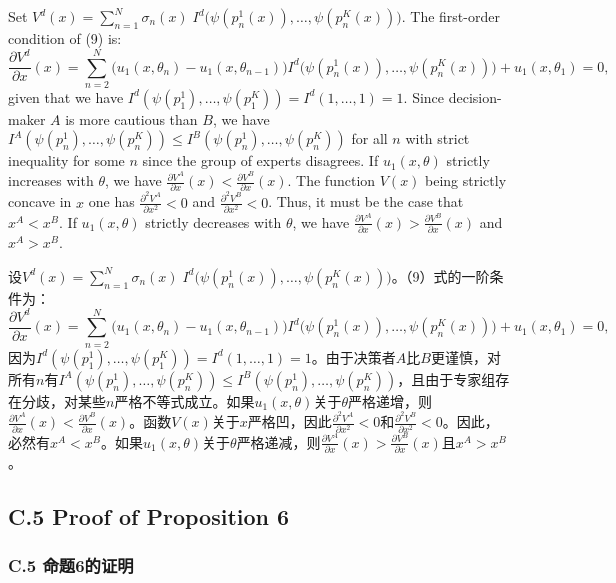 \documentclass[12pt,a4paper]{article}
\newenvironment{original}
  {\par\noindent\ignorespaces}
  {\par}
\newenvironment{translation}
  {\par\noindent{\color{transblue}\ignorespaces}}
  {\par\medskip}
\begin{document}
\begin{original}
Set $V^{d}(x) = \sum_{n=1}^{N} \sigma_{n}(x) \; I^{d}\!\big(\psi(p^{1}_{n}(x)), \dots, \psi(p^{K}_{n}(x))\big)$. The first-order condition of (9) is:
\[
\frac{\partial V^{d}}{\partial x}(x) = \sum_{n=2}^{N} \Big(u_{1}(x, \theta_{n}) - u_{1}(x, \theta_{n-1})\Big) I^{d}\!\big(\psi(p^{1}_{n}(x)), \dots, \psi(p^{K}_{n}(x))\big) + u_{1}(x, \theta_{1}) = 0, \tag{C.3}
\]
given that we have $I^{d}(\psi(p^{1}_{1}), \dots, \psi(p^{K}_{1})) = I^{d}(1, \dots, 1) = 1$. Since decision-maker $A$ is more cautious than $B$, we have $I^{A}(\psi(p^{1}_{n}), \dots, \psi(p^{K}_{n})) \leq I^{B}(\psi(p^{1}_{n}), \dots, \psi(p^{K}_{n}))$ for all $n$ with strict inequality for some $n$ since the group of experts disagrees. If $u_{1}(x, \theta)$ strictly increases with $\theta$, we have $\frac{\partial V^{A}}{\partial x}(x) < \frac{\partial V^{B}}{\partial x}(x)$. The function $V(x)$ being strictly concave in $x$ one has $\frac{\partial^{2} V^{A}}{\partial x^{2}} < 0$ and $\frac{\partial^{2} V^{B}}{\partial x^{2}} < 0$. Thus, it must be the case that $x^{A} < x^{B}$. If $u_{1}(x, \theta)$ strictly decreases with $\theta$, we have $\frac{\partial V^{A}}{\partial x}(x) > \frac{\partial V^{B}}{\partial x}(x)$ and $x^{A} > x^{B}$.
\end{original}

\begin{translation}
设$V^{d}(x) = \sum_{n=1}^{N} \sigma_{n}(x) \; I^{d}\!\big(\psi(p^{1}_{n}(x)), \dots, \psi(p^{K}_{n}(x))\big)$。（9）式的一阶条件为：
\[
\frac{\partial V^{d}}{\partial x}(x) = \sum_{n=2}^{N} \Big(u_{1}(x, \theta_{n}) - u_{1}(x, \theta_{n-1})\Big) I^{d}\!\big(\psi(p^{1}_{n}(x)), \dots, \psi(p^{K}_{n}(x))\big) + u_{1}(x, \theta_{1}) = 0, \tag{C.3}
\]
因为$I^{d}(\psi(p^{1}_{1}), \dots, \psi(p^{K}_{1})) = I^{d}(1, \dots, 1) = 1$。由于决策者$A$比$B$更谨慎，对所有$n$有$I^{A}(\psi(p^{1}_{n}), \dots, \psi(p^{K}_{n})) \leq I^{B}(\psi(p^{1}_{n}), \dots, \psi(p^{K}_{n}))$，且由于专家组存在分歧，对某些$n$严格不等式成立。如果$u_{1}(x, \theta)$关于$\theta$严格递增，则$\frac{\partial V^{A}}{\partial x}(x) < \frac{\partial V^{B}}{\partial x}(x)$。函数$V(x)$关于$x$严格凹，因此$\frac{\partial^{2} V^{A}}{\partial x^{2}} < 0$和$\frac{\partial^{2} V^{B}}{\partial x^{2}} < 0$。因此，必然有$x^{A} < x^{B}$。如果$u_{1}(x, \theta)$关于$\theta$严格递减，则$\frac{\partial V^{A}}{\partial x}(x) > \frac{\partial V^{B}}{\partial x}(x)$且$x^{A} > x^{B}$。
\end{translation}

\subsection*{C.5 Proof of Proposition 6}
{\color{transblue}\subsubsection*{C.5 命题6的证明}}
\end{document}
